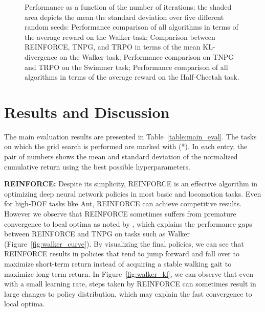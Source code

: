 \documentclass{article}
\begin{document}
\begin{figure*}[!t]
\caption{Performance as a function of the number of iterations; the shaded area depicts the mean  the standard deviation over five different random seeds:  Performance comparison of all algorithms in terms of the average reward on the Walker task;  Comparison between REINFORCE, TNPG, and TRPO in terms of the mean KL-divergence on the Walker task;  Performance comparison on TNPG and TRPO on the Swimmer task;  Performance comparison of all algorithms in terms of the average reward on the Half-Cheetah task.}\label{fig:test}
\end{figure*}



\section{Results and Discussion}


\label{section:results}

The main evaluation results are presented in Table~\ref{table:main_eval}. The tasks on which the grid search is performed are marked with (*). In each entry, the pair of numbers shows the mean and standard deviation of the normalized cumulative return using the best possible hyperparameters.

{\bf REINFORCE:} Despite its simplicity, REINFORCE is an effective algorithm in optimizing deep neural network policies in most basic and locomotion tasks. Even for high-DOF tasks like Ant, REINFORCE can achieve competitive results. However we observe that REINFORCE sometimes suffers from premature convergence to local optima as noted by \citet{peters2008reinforcement}, which explains the performance gaps between REINFORCE and TNPG on tasks such as Walker (Figure~\ref{fig:walker_curve}). By visualizing the final policies, we can see that REINFORCE results in policies that tend to jump forward and fall over to maximize short-term return instead of acquiring a stable walking gait to maximize long-term return. In Figure~\ref{fig:walker_kl}, we can observe that even with a small learning rate, steps taken by REINFORCE can sometimes result in large changes to policy distribution, which may explain the fast convergence to local optima. 
\end{document}
